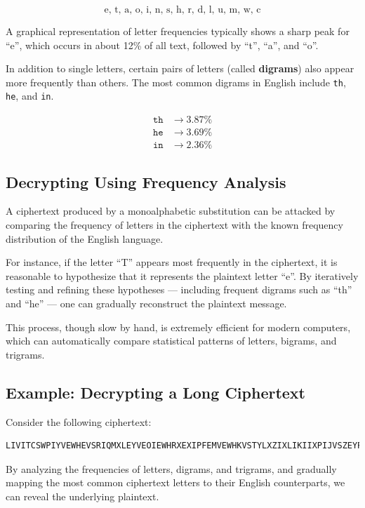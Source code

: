 \[
\text{e, t, a, o, i, n, s, h, r, d, l, u, m, w, c}
\]

A graphical representation of letter frequencies typically shows a sharp peak for “e”, which occurs in about 12\% of all text, followed by “t”, “a”, and “o”.

In addition to single letters, certain pairs of letters (called \textbf{digrams}) also appear more frequently than others.  
The most common digrams in English include \texttt{th}, \texttt{he}, and \texttt{in}.

\[
\begin{aligned}
\texttt{th} &\rightarrow 3.87\% \\
\texttt{he} &\rightarrow 3.69\% \\
\texttt{in} &\rightarrow 2.36\%
\end{aligned}
\]

\subsection{Decrypting Using Frequency Analysis}

A ciphertext produced by a monoalphabetic substitution can be attacked by comparing the frequency of letters in the ciphertext with the known frequency distribution of the English language.

For instance, if the letter “T” appears most frequently in the ciphertext, it is reasonable to hypothesize that it represents the plaintext letter “e”.  
By iteratively testing and refining these hypotheses — including frequent digrams such as “th” and “he” — one can gradually reconstruct the plaintext message.

This process, though slow by hand, is extremely efficient for modern computers, which can automatically compare statistical patterns of letters, bigrams, and trigrams.

\subsection{Example: Decrypting a Long Ciphertext}

Consider the following ciphertext:

\begin{verbatim}
LIVITCSWPIYVEWHEVSRIQMXLEYVEOIEWHRXEXIPFEMVEWHKVSTYLXZIXLIKIIXPIJVSZEYPE...
\end{verbatim}

By analyzing the frequencies of letters, digrams, and trigrams, and gradually mapping the most common ciphertext letters to their English counterparts, we can reveal the underlying plaintext.  

